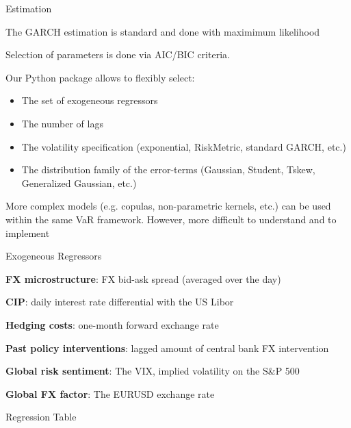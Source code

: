 \documentclass{beamer}
\newenvironment{largeitemize}{\itemize\addtolength{\itemsep}{10pt}}{\enditemize}
\newenvironment{largeenumerate}{\enumerate\addtolength{\itemsep}{10pt}}{\endenumerate}
\begin{document}
\begin{frame}{Estimation}
\begin{largeitemize}
\item The GARCH estimation is standard and done with maximimum likelihood
 \item Selection of parameters is done via AIC/BIC criteria.    
  \item Our Python package allows to flexibly select:
    \begin{itemize}
    \item The set of exogeneous regressors
    \item The number of lags
    \item The volatility specification (exponential, RiskMetric, standard GARCH,
      etc.)
    \item The distribution family of the error-terms (Gaussian,
    Student, Tskew, Generalized Gaussian, etc.)  
  \end{itemize}
\item More complex models (e.g. copulas, non-parametric kernels, etc.) can be
  used within the same VaR framework. However, more difficult to understand
  and to implement
\end{largeitemize}
\end{frame}

\begin{frame}{Exogeneous Regressors}
  \begin{largeenumerate}
  \item \textbf{FX microstructure}: FX bid-ask spread (averaged over the day)
  \item \textbf{CIP}: daily interest rate differential with the US Libor 
  \item \textbf{Hedging costs}: one-month forward exchange rate
  \item \textbf{Past policy interventions}: lagged amount of central bank FX intervention 
  \item \textbf{Global risk sentiment}: The VIX, implied volatility on the S\&P 500 
  \item \textbf{Global FX factor}: The EURUSD exchange rate
  \end{largeenumerate}
 
\end{frame}


\begin{frame}{Regression Table}
\setlength\tabcolsep{2pt}  %
\tiny  %

\normalsize
\end{frame}
\end{document}
